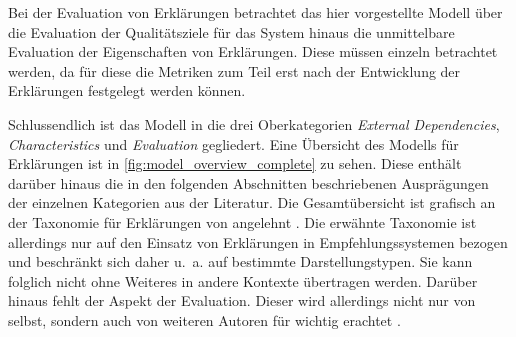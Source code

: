 Bei der Evaluation von Erklärungen betrachtet das hier vorgestellte Modell über die Evaluation der Qualitätsziele für das System hinaus \cite[vgl.][]{schneider2012abenteuer} die unmittelbare Evaluation der Eigenschaften von Erklärungen. Diese müssen einzeln betrachtet werden, da für diese die Metriken zum Teil erst nach der Entwicklung der Erklärungen festgelegt werden können.

\smallbreak

Schlussendlich ist das Modell in die drei Oberkategorien \textit{External Dependencies}, \textit{Characteristics} und \textit{Evaluation} gegliedert. Eine Übersicht des Modells für Erklärungen ist in \autoref{fig:model_overview_complete} zu sehen. Diese enthält darüber hinaus die in den folgenden Abschnitten beschriebenen Ausprägungen der einzelnen Kategorien aus der Literatur. Die Gesamtübersicht ist grafisch an der Taxonomie für Erklärungen von \citeauthor{nunes_systematic_2017} angelehnt \cite{nunes_systematic_2017}. Die erwähnte Taxonomie ist allerdings nur auf den Einsatz von Erklärungen in Empfehlungssystemen bezogen und beschränkt sich daher u.~a. auf bestimmte Darstellungstypen. Sie kann folglich nicht ohne Weiteres in andere Kontexte übertragen werden. Darüber hinaus fehlt der Aspekt der Evaluation. Dieser wird allerdings nicht nur von \citeauthor{nunes_systematic_2017} selbst, sondern auch von weiteren Autoren für wichtig erachtet \cite{cirqueira_scenario-based_2020, martin_evaluating_2021,nunes_systematic_2017}.

\newpage
\null
\vfill

